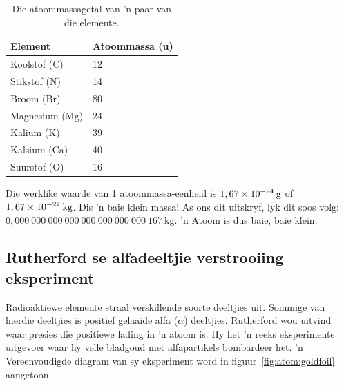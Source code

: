           \begin{table}[H]
        \begin{center}
      \label{m38756*uid8}
    \noindent
      \begin{tabular}{|l|l|}\hline
                  \textbf{Element}
                 &
                  \textbf{Atoommassa (u)}
                \\ \hline
        Koolstof ($\text{C}$) &
        12 \\ \hline
        Stikstof ($\text{N}$) &
        14 \\ \hline
        Broom ($\text{Br}$) &
        80 \\ \hline
        Magnesium ($\text{Mg}$) &
        24 \\ \hline
        Kalium ($\text{K}$) &
        39 \\ \hline
        Kalsium ($\text{Ca}$) &
        40 \\ \hline
        Suurstof ($\text{O}$) &
        16 \\ \hline
    \end{tabular}
      \end{center}
    \caption{Die atoommassagetal van 'n paar van die elemente.}
\label{tab:atomic mass}
\end{table}
    \par
        \label{m38756*id255096}
Die werklike waarde van 1 atoommassa-eenheid is $1,67\ensuremath{\times}{10}^{-24}\phantom{\rule{2pt}{0ex}}\text{g}$ of $1,67\ensuremath{\times}{10}^{-27}\phantom{\rule{2pt}{0ex}}\text{kg}$. Dis 'n baie klein massa! As ons dit uitskryf, lyk dit soos volg: $0,000~000~000~000~000~000~000~000~167~\text{kg}$. 'n Atoom is dus baie, baie klein.
            \subsection*{Rutherford se alfadeeltjie verstrooiing eksperiment}
            \nopagebreak
            \label{m38756*id254668}
Radioaktiewe elemente straal verskillende soorte deeltjies uit. Sommige van hierdie deeltjies is positief gelaaide alfa ($\alpha $) deeltjies. Rutherford wou uitvind waar presies die positiewe lading in 'n atoom is. Hy het  'n reeks eksperimente uitgevoer waar hy velle bladgoud met alfapartikels bombardeer het.  'n Vereenvoudigde diagram van sy eksperiment word in figuur~\ref{fig:atom:goldfoil} aangetoon.\par 

